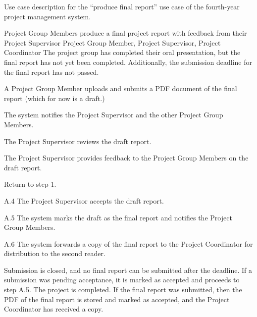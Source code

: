 \documentclass[document.tex]{subfiles}
\begin{document}
\begin{table}
  \centering
  \caption{Use case description for the ``produce final report'' use case of the fourth-year project management system.}
  \label{tbl:use-case-final-report}

  \begin{usecase}
    Project Group Members produce a final project report with feedback from their Project Supervisor
    Project Group Member, Project Supervisor, Project Coordinator
    The project group has completed their oral presentation, but the final report has not yet been completed. Additionally, the submission deadline for the final report has not passed.
    \ucnormal
    \begin{ucenum}
      \item A Project Group Member uploads and submits a PDF document of the final report (which for now is a draft.)
      \item The system notifies the Project Supervisor and the other Project Group Members.
      \item The Project Supervisor reviews the draft report.
      \item The Project Supervisor provides feedback to the Project Group Members on the draft report.
      \item Return to step 1.
    \end{ucenum}
    \begin{ucenum}
      \item [A.4] The Project Supervisor accepts the draft report.
      \item [A.5] The system marks the draft as the final report and notifies the Project Group Members.
      \item [A.6] The system forwards a copy of the final report to the Project Coordinator for distribution to the second reader.
    \end{ucenum}
    Submission is closed, and no final report can be submitted after the deadline. If a submission was pending acceptance, it is marked as accepted and proceeds to step A.5.
    The project is completed. If the final report was submitted, then the PDF of the final report is stored and marked as accepted, and the Project Coordinator has received a copy.
  \end{usecase}
\end{table}
\end{document}
